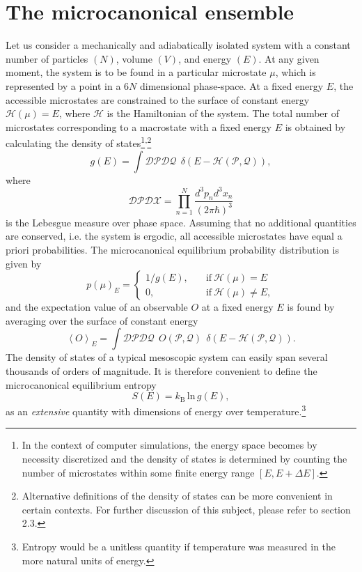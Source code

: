 \documentclass[12pt]{report}
\begin{document}
\section{The microcanonical ensemble}
Let us consider a mechanically and adiabatically isolated system with a constant number of particles $(N)$, volume $(V)$, and energy $(E)$. At any given moment, the system is to be found in a particular microstate $\mu$, which is represented by a point in a $6N$ dimensional phase-space. At a fixed energy $E$, the accessible microstates are constrained to the surface of constant energy $\mathcal{H}(\mu) = E$, where $\mathcal{H}$ is the Hamiltonian of the system. The total number of microstates corresponding to a macrostate with a fixed energy $E$ is obtained by calculating the density of states\footnote{In the context of computer simulations, the energy space becomes by necessity discretized and the density of states is determined by counting the number of microstates within some finite energy range $[E,E+\Delta E]$.}\textsuperscript{,}\footnote{Alternative definitions of the density of states can be more convenient in certain contexts. For further discussion of this subject, please refer to section 2.3.}
\begin{equation}
g(E) = \int \mathcal{DP}\mathcal{DQ} \:\: \delta(E - \mathcal{H}(\mathcal{P},\mathcal{Q})),
\end{equation} 
where 
\begin{equation}
\mathcal{DP}\mathcal{DX} = \prod_{n = 1}^{N} \frac{d^{3}p_{n}d^{3}x_{n}}{(2 \pi \hbar)^{3}}
\end{equation}
is the Lebesgue measure over phase space.
Assuming that no additional quantities are conserved, i.e. the system is ergodic, all accessible microstates have equal a priori probabilities. The microcanonical equilibrium probability distribution is given by 
\begin{equation}
p(\mu)_{E} = \left\{
\begin{array}{lr}
1/g(E), & \quad
\mathrm{if} \: \mathcal{H(\mu)} = E\\
0, & \quad \mathrm{if} \: \mathcal{H(\mu)} \neq E,
\end{array}
\right.
\end{equation}
and the expectation value of an observable $O$ at a fixed energy $E$ is found by averaging over the surface of constant energy
\begin{equation}
\left< O \right>_{E} = \int \mathcal{DP}\mathcal{DQ} \:\: O(\mathcal{P},\mathcal{Q}) \:\: \delta(E - \mathcal{H}(\mathcal{P},\mathcal{Q})).
\end{equation}
The density of states of a typical mesoscopic system can easily span several thousands of orders of magnitude. It is therefore convenient to define the microcanonical equilibrium entropy
\begin{equation}
S(E) = k_\mathrm{B}\, \mathrm{ln}\, g(E),
\end{equation}
as an \textit{extensive} quantity with dimensions of energy over temperature.\footnote{Entropy would be a unitless quantity if temperature was measured in the more natural units of energy.}
\end{document}
